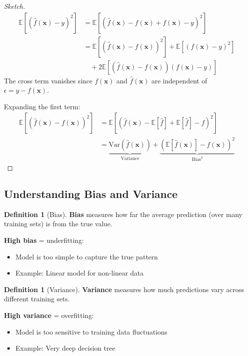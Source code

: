 \documentclass[11pt,twoside]{article}
\numberwithin{equation}{section}
\newcommand{\E}{\mathbb{E}}
\newcommand{\Var}{\mathrm{Var}}
\newcommand{\vect}[1]{\bm{#1}}
\theoremstyle{plain}
\theoremstyle{definition}
\newtheorem{definition}[theorem]{Definition}
\theoremstyle{remark}
\begin{document}
\begin{proof}[Sketch]
\begin{align}
\E[(\hat{f}(\vect{x}) - y)^2] &= \E[(\hat{f}(\vect{x}) - f(\vect{x}) + f(\vect{x}) - y)^2] \\
&= \E[(\hat{f}(\vect{x}) - f(\vect{x}))^2] + \E[(f(\vect{x}) - y)^2] \\
&\quad + 2\E[(\hat{f}(\vect{x}) - f(\vect{x}))(f(\vect{x}) - y)]
\end{align}
The cross term vanishes since $f(\vect{x})$ and $\hat{f}(\vect{x})$ are independent of $\epsilon = y - f(\vect{x})$.

Expanding the first term:
\begin{align}
\E[(\hat{f}(\vect{x}) - f(\vect{x}))^2] &= \E[(\hat{f}(\vect{x}) - \E[\hat{f}] + \E[\hat{f}] - f)^2] \\
&= \underbrace{\Var(\hat{f}(\vect{x}))}_{\text{Variance}} + \underbrace{(\E[\hat{f}(\vect{x})] - f(\vect{x}))^2}_{\text{Bias}^2}
\end{align}
\end{proof}

\subsection{Understanding Bias and Variance}

\begin{definition}[Bias]
\textbf{Bias} measures how far the average prediction (over many training sets) is from the true value.

\textbf{High bias} = underfitting:
\begin{itemize}
\item Model is too simple to capture the true pattern
\item Example: Linear model for non-linear data
\end{itemize}
\end{definition}

\begin{definition}[Variance]
\textbf{Variance} measures how much predictions vary across different training sets.

\textbf{High variance} = overfitting:
\begin{itemize}
\item Model is too sensitive to training data fluctuations
\item Example: Very deep decision tree
\end{itemize}
\end{definition}
\end{document}
